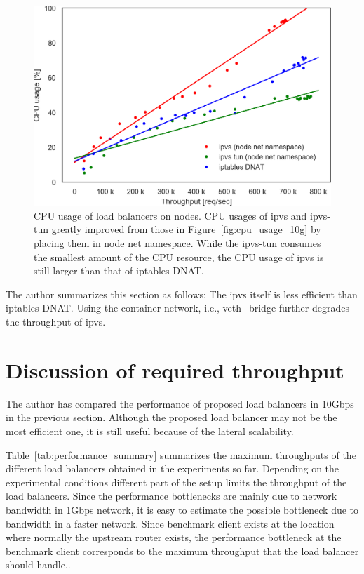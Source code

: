 \begin{figure}[h]
  \centering
  \includegraphics[width=0.8\columnwidth]{Figs/cpu_usage_10g_node_ns}
  \par\bigskip
  \centering
  \begin{minipage}{0.9\columnwidth}
    \caption[CPU usage of load balancers on nodes]{
      CPU usage of load balancers on nodes.
      CPU usages of ipvs and ipvs-tun greatly improved from those in Figure~\ref{fig:cpu_usage_10g} by placing them in node net namespace.  
      While the ipvs-tun consumes the smallest amount of the CPU resource, the CPU usage of ipvs is still larger than that of iptables DNAT.
    }
    \label{fig:cpu_usage_10g_node_ns}
  \end{minipage}
\end{figure}

The author summarizes this section as follows;
The ipvs itself is less efficient than iptables DNAT.
Using the container network, i.e., veth+bridge further degrades the throughput of ipvs.

\FloatBarrier

\section{Discussion of required throughput}

The author has compared the performance of proposed load balancers in 10Gbps in the previous section.
Although the proposed load balancer may not be the most efficient one, it is still useful because of the lateral scalability.

Table~\ref{tab:performance_summary} summarizes the maximum throughputs of the different load balancers obtained in the experiments so far.
Depending on the experimental conditions different part of the setup limits the throughput of the load balancers.
Since the performance bottlenecks are mainly due to network bandwidth in 1Gbps network, it is easy to estimate the possible bottleneck due to bandwidth in a faster network.
Since benchmark client exists at the location where normally the upstream router exists, the performance bottleneck at the benchmark client corresponds to the maximum throughput that the load balancer should handle..

